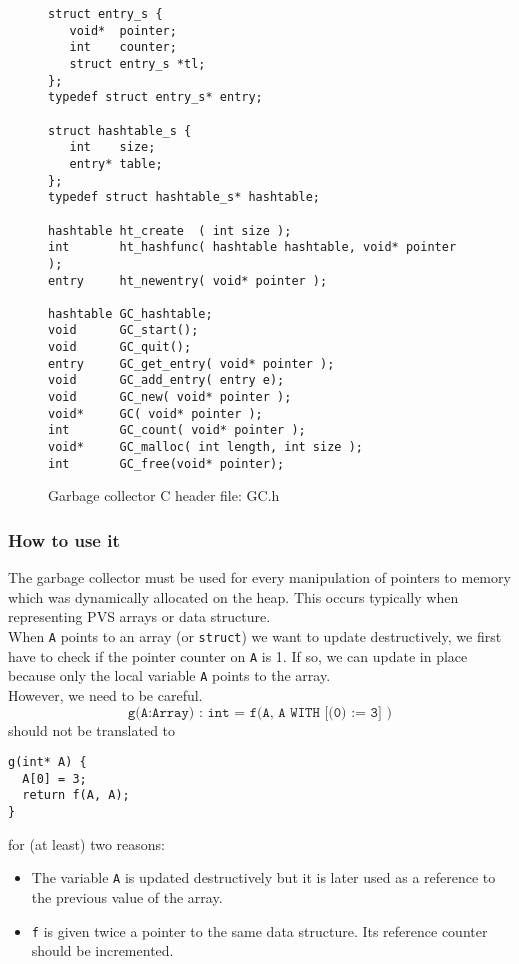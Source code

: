 \documentclass[12pt,a4paper]{article}
\newcommand{\cl}[1]{\texttt{#1}}
\begin{document}
\begin{figure}
\begin{lstlisting}
struct entry_s {
   void*  pointer;
   int    counter;
   struct entry_s *tl;
};
typedef struct entry_s* entry;

struct hashtable_s {
   int    size;
   entry* table;	
}; 
typedef struct hashtable_s* hashtable;

hashtable ht_create  ( int size );
int       ht_hashfunc( hashtable hashtable, void* pointer );
entry     ht_newentry( void* pointer );

hashtable GC_hashtable;
void      GC_start();
void      GC_quit();
entry     GC_get_entry( void* pointer );
void      GC_add_entry( entry e);
void      GC_new( void* pointer );
void*     GC( void* pointer );
int       GC_count( void* pointer );
void*     GC_malloc( int length, int size );
int       GC_free(void* pointer);
\end{lstlisting}
\caption{Garbage collector C header file: GC.h}
\label{fig:GC.h}
\end{figure}



\subsubsection{How to use it}

The garbage collector must be used for every manipulation of pointers to memory which was dynamically allocated on the heap. This occurs typically when representing PVS arrays or data structure. \\

When \cl{A} points to an array (or \cl{struct}) we want to update destructively, we first have to check if the pointer counter on \cl{A} is 1. If so, we can update in place because only the local variable \cl{A} points to the array.\\

However, we need to be careful.
$$ \cl{g(A:Array) : int = f(A, A WITH [(0) := 3] )}$$
should not be translated to
\begin{lstlisting}
g(int* A) {
  A[0] = 3;
  return f(A, A);
}
\end{lstlisting}
for (at least) two reasons:
\begin{itemize}
\item The variable \cl{A} is updated destructively but it is later used as a reference to the previous value of the array.
\item \cl{f} is given twice a pointer to the same data structure. Its reference counter should be incremented.
\end{itemize}
\end{document}
